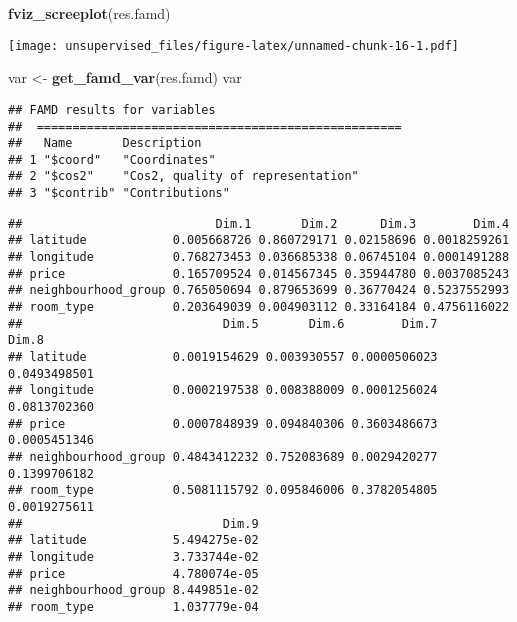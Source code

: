 \documentclass[
]{article}
\newenvironment{Shaded}{\begin{snugshade}}{\end{snugshade}}
\newcommand{\CommentTok}[1]{\textcolor[rgb]{0.56,0.35,0.01}{\textit{#1}}}
\newcommand{\KeywordTok}[1]{\textcolor[rgb]{0.13,0.29,0.53}{\textbf{#1}}}
\newcommand{\NormalTok}[1]{#1}
\newcommand{\OperatorTok}[1]{\textcolor[rgb]{0.81,0.36,0.00}{\textbf{#1}}}
\newcommand{\StringTok}[1]{\textcolor[rgb]{0.31,0.60,0.02}{#1}}
\begin{document}
\begin{Shaded}
\begin{Highlighting}[]
\KeywordTok{fviz_screeplot}\NormalTok{(res.famd)}
\end{Highlighting}
\end{Shaded}

\texttt{[image: unsupervised\_files/figure-latex/unnamed-chunk-16-1.pdf]}

\begin{Shaded}
\begin{Highlighting}[]
\NormalTok{var <-}\StringTok{ }\KeywordTok{get_famd_var}\NormalTok{(res.famd)}
\NormalTok{var}
\end{Highlighting}
\end{Shaded}

\begin{verbatim}
## FAMD results for variables 
##  ===================================================
##   Name       Description                      
## 1 "$coord"   "Coordinates"                    
## 2 "$cos2"    "Cos2, quality of representation"
## 3 "$contrib" "Contributions"
\end{verbatim}

\begin{Shaded}
\end{Shaded}

\begin{verbatim}
##                           Dim.1       Dim.2      Dim.3        Dim.4
## latitude            0.005668726 0.860729171 0.02158696 0.0018259261
## longitude           0.768273453 0.036685338 0.06745104 0.0001491288
## price               0.165709524 0.014567345 0.35944780 0.0037085243
## neighbourhood_group 0.765050694 0.879653699 0.36770424 0.5237552993
## room_type           0.203649039 0.004903112 0.33164184 0.4756116022
##                            Dim.5       Dim.6        Dim.7        Dim.8
## latitude            0.0019154629 0.003930557 0.0000506023 0.0493498501
## longitude           0.0002197538 0.008388009 0.0001256024 0.0813702360
## price               0.0007848939 0.094840306 0.3603486673 0.0005451346
## neighbourhood_group 0.4843412232 0.752083689 0.0029420277 0.1399706182
## room_type           0.5081115792 0.095846006 0.3782054805 0.0019275611
##                            Dim.9
## latitude            5.494275e-02
## longitude           3.733744e-02
## price               4.780074e-05
## neighbourhood_group 8.449851e-02
## room_type           1.037779e-04
\end{verbatim}
\end{document}
